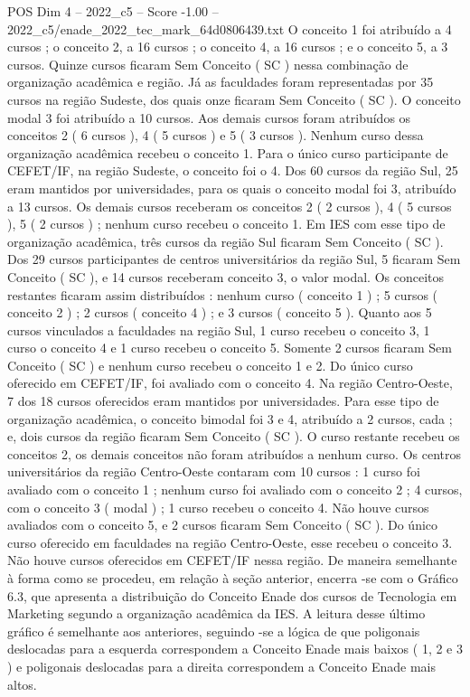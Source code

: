 \begin{textsample}{POS Dim 4 – 2022\_c5 – Score -1.00 – 2022\_c5/enade\_2022\_tec\_mark\_64d0806439.txt}
O conceito 1 foi atribuído a 4 cursos ; o conceito 2, a 16 cursos ; o conceito 4, a 16 cursos ; e o conceito 5, a 3 cursos.
Quinze cursos ficaram Sem Conceito ( SC ) nessa combinação de organização acadêmica e região.
Já as faculdades foram representadas por 35 cursos na região Sudeste, dos quais onze ficaram Sem Conceito ( SC ).
O conceito modal 3 foi atribuído a 10 cursos.
Aos demais cursos foram atribuídos os conceitos 2 ( 6 cursos ), 4 ( 5 cursos ) e 5 ( 3 cursos ).
Nenhum curso dessa organização acadêmica recebeu o conceito 1.
Para o único curso participante de CEFET/IF, na região Sudeste, o conceito foi o 4.
Dos 60 cursos da região Sul, 25 eram mantidos por universidades, para os quais o conceito modal foi 3, atribuído a 13 cursos.
Os demais cursos receberam os conceitos 2 ( 2 cursos ), 4 ( 5 cursos ), 5 ( 2 cursos ) ; nenhum curso recebeu o conceito 1.
Em IES com esse tipo de organização acadêmica, três cursos da região Sul ficaram Sem Conceito ( SC ).
Dos 29 cursos participantes de centros universitários da região Sul, 5 ficaram Sem Conceito ( SC ), e 14 cursos receberam conceito 3, o valor modal.
Os conceitos restantes ficaram assim distribuídos : nenhum curso ( conceito 1 ) ; 5 cursos ( conceito 2 ) ; 2 cursos ( conceito 4 ) ; e 3 cursos ( conceito 5 ).
Quanto aos 5 cursos vinculados a faculdades na região Sul, 1 curso recebeu o conceito 3, 1 curso o conceito 4 e 1 curso recebeu o conceito 5.
Somente 2 cursos ficaram Sem Conceito ( SC ) e nenhum curso recebeu o conceito 1 e 2.
Do único curso oferecido em CEFET/IF, foi avaliado com o conceito 4.
Na região Centro-Oeste, 7 dos 18 cursos oferecidos eram mantidos por universidades.
Para esse tipo de organização acadêmica, o conceito bimodal foi 3 e 4, atribuído a 2 cursos, cada ; e, dois cursos da região ficaram Sem Conceito ( SC ).
O curso restante recebeu os conceitos 2, os demais conceitos não foram atribuídos a nenhum curso.
Os centros universitários da região Centro-Oeste contaram com 10 cursos : 1 curso foi avaliado com o conceito 1 ; nenhum curso foi avaliado com o conceito 2 ; 4 cursos, com o conceito 3 ( modal ) ; 1 curso recebeu o conceito 4.
Não houve cursos avaliados com o conceito 5, e 2 cursos ficaram Sem Conceito ( SC ).
Do único curso oferecido em faculdades na região Centro-Oeste, esse recebeu o conceito 3.
Não houve cursos oferecidos em CEFET/IF nessa região.
De maneira semelhante à forma como se procedeu, em relação à seção anterior, encerra -se com o Gráfico 6.3, que apresenta a distribuição do Conceito Enade dos cursos de Tecnologia em Marketing segundo a organização acadêmica da IES.
A leitura desse último gráfico é semelhante aos anteriores, seguindo -se a lógica de que poligonais deslocadas para a esquerda correspondem a Conceito Enade mais baixos ( 1, 2 e 3 ) e poligonais deslocadas para a direita correspondem a Conceito Enade mais altos.

\end{textsample}
